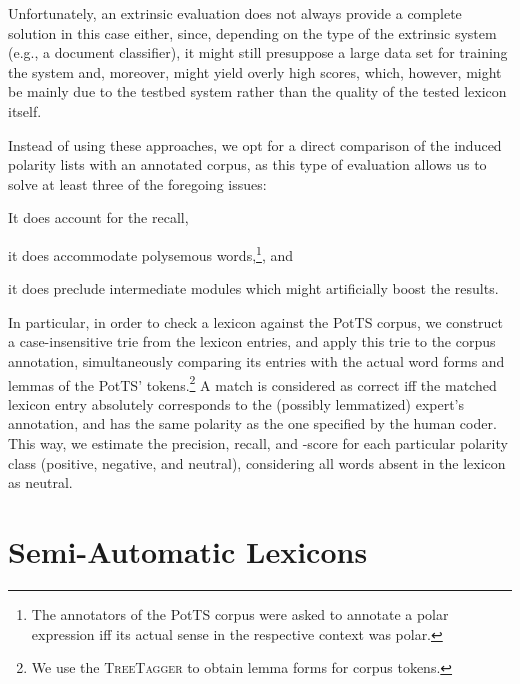 Unfortunately, an extrinsic evaluation does not always provide a
complete solution in this case either, since, depending on the type of
the extrinsic system (e.g., a document classifier), it might still
presuppose a large data set for training the system and, moreover,
might yield overly high scores, which, however, might be mainly due to
the testbed system rather than the quality of the tested lexicon
itself.

Instead of using these approaches, we opt for a direct comparison of
the induced polarity lists with an annotated corpus, as this type of
evaluation allows us to solve at least three of the foregoing issues:
\begin{inparaenum}[(i)]
  \item It does account for the recall,
  \item it does accommodate polysemous words,\footnote{The annotators
      of the PotTS corpus were asked to annotate a polar expression
      iff its actual sense in the respective context was polar.}, and
  \item it does preclude intermediate modules which might artificially
    boost the results.
\end{inparaenum}

In particular, in order to check a lexicon against the PotTS corpus,
we construct a case-insensitive trie \cite[pp. 492--512]{Knuth:98}
from the lexicon entries, and apply this trie to the corpus
annotation, simultaneously comparing its entries with the actual word
forms and lemmas of the PotTS' tokens.\footnote{We use the
  \textsc{TreeTagger} \cite{Schmid:95} to obtain lemma forms for
  corpus tokens.} A match is considered as correct iff the matched
lexicon entry absolutely corresponds to the (possibly lemmatized)
expert's annotation, and has the same polarity as the one specified by
the human coder.  This way, we estimate the precision, recall, and
\F{}-score for each particular polarity class (positive, negative, and
neutral), considering all words absent in the lexicon as neutral.

\section{Semi-Automatic Lexicons}

